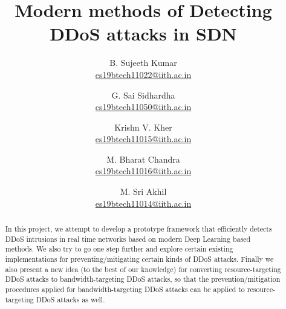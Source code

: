 \documentclass[10pt,twocolumn,letterpaper]{article}
\begin{document}
\title{Modern methods of Detecting DDoS attacks in SDN}

\author{B. Sujeeth Kumar\\
\href{mailto:es19btech11022@iith.ac.in}{es19btech11022@iith.ac.in}
\and
G. Sai Sidhardha\\
\href{mailto:cs19btech11050@iith.ac.in}{cs19btech11050@iith.ac.in}
\and
Krishn V. Kher\\
\href{mailto:es19btech11015@iith.ac.in}{es19btech11015@iith.ac.in}
\and
M. Bharat Chandra\\
\href{mailto:es19btech11016@iith.ac.in}{es19btech11016@iith.ac.in}
\and
M. Sri Akhil\\
\href{mailto:es19btech11014@iith.ac.in}{es19btech11014@iith.ac.in}
}

\maketitle

\begin{abstract}
In this project, we attempt to develop a prototype framework that efficiently detects DDoS intrusions in real time networks based on modern Deep Learning based methods. We also try to go one step further and explore certain existing implementations for preventing/mitigating certain kinds of DDoS attacks. Finally we also present a new idea (to the best of our knowledge) for converting resource-targeting DDoS attacks to bandwidth-targeting DDoS attacks, so that the prevention/mitigation procedures applied for bandwidth-targeting DDoS attacks can be applied to resource-targeting DDoS attacks as well.
\end{abstract}

\end{document}

